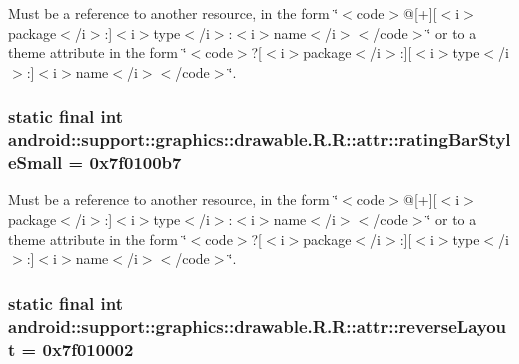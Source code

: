 Must be a reference to another resource, in the form \char`\"{}$<$code$>$@\mbox{[}+\mbox{]}\mbox{[}$<$i$>$package$<$/i$>$:\mbox{]}$<$i$>$type$<$/i$>$:$<$i$>$name$<$/i$>$$<$/code$>$\char`\"{} or to a theme attribute in the form \char`\"{}$<$code$>$?\mbox{[}$<$i$>$package$<$/i$>$:\mbox{]}\mbox{[}$<$i$>$type$<$/i$>$:\mbox{]}$<$i$>$name$<$/i$>$$<$/code$>$\char`\"{}. \hypertarget{classandroid_1_1support_1_1graphics_1_1drawable_1_1_r_1_1attr_17c11af31741c238e16766b1d39b89d5}{
\subsubsection[{ratingBarStyleSmall}]{\setlength{\rightskip}{0pt plus 5cm}static final int android::support::graphics::drawable.R.R::attr::ratingBarStyleSmall = 0x7f0100b7}}
\label{classandroid_1_1support_1_1graphics_1_1drawable_1_1_r_1_1attr_17c11af31741c238e16766b1d39b89d5}


Must be a reference to another resource, in the form \char`\"{}$<$code$>$@\mbox{[}+\mbox{]}\mbox{[}$<$i$>$package$<$/i$>$:\mbox{]}$<$i$>$type$<$/i$>$:$<$i$>$name$<$/i$>$$<$/code$>$\char`\"{} or to a theme attribute in the form \char`\"{}$<$code$>$?\mbox{[}$<$i$>$package$<$/i$>$:\mbox{]}\mbox{[}$<$i$>$type$<$/i$>$:\mbox{]}$<$i$>$name$<$/i$>$$<$/code$>$\char`\"{}. \hypertarget{classandroid_1_1support_1_1graphics_1_1drawable_1_1_r_1_1attr_fafc285bbe92df1b56151769e2fd6c88}{
\subsubsection[{reverseLayout}]{\setlength{\rightskip}{0pt plus 5cm}static final int android::support::graphics::drawable.R.R::attr::reverseLayout = 0x7f010002}}
\label{classandroid_1_1support_1_1graphics_1_1drawable_1_1_r_1_1attr_fafc285bbe92df1b56151769e2fd6c88}


